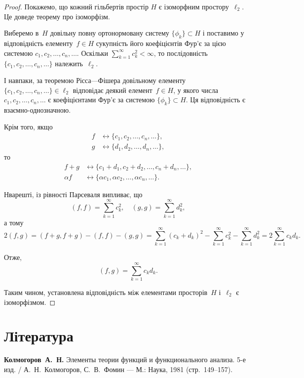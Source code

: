 \begin{proof}
Покажемо, що кожний гільбертів простір
$H$ є ізоморфним простору~$\ell_2$.
Це доведе теорему про ізоморфізм.

Виберемо в~$H$ довільну повну ортонормовану систему
$\{\phi_k\} \subset H$ і поставимо у відповідність елементу~$f \in H$
сукупність його коефіцієнтів Фур’є за цією системою
$c_1, c_2, \dots, c_n, \dots$. Оскільки
$\sum_{k = 1}^\infty c_k^2 < \infty$, то послідовність
$\{c_1, c_2, \dots, c_n, \dots\}$ належить~$\ell_2$.

І навпаки, за теоремою Рісса---Фішера довільному елементу
$\{c_1, c_2, \dots, c_n, \dots\} \in \ell_2$
відповідає деякий елемент~$f \in H$, у якого числа
$c_1, c_2, \dots, c_n, \dots$ є коефіцієнтами Фур’є за системою
$\{\phi_k\} \subset H$. Ця відповідність є взаємно-однозначною.

Крім того, якщо
\begin{align*}
    f &\leftrightarrow \{c_1, c_2, \dots, c_n, \dots\}, \\
    g &\leftrightarrow \{d_1, d_2, \dots, d_n, \dots\},
\end{align*}
то
\begin{align*}
    f + g &\leftrightarrow \{c_ 1 + d_1, c_2 + d_2, \dots, c_n + d_n, \dots\}, \\
    \alpha f &\leftrightarrow \{\alpha c_1, \alpha c_2, \dots, \alpha c_n, \dots\}.
\end{align*}

Нварешті, із рівності Парсеваля випливає, що
\begin{equation*}
    (f, f) = \sum_{k = 1}^\infty c_k^2, \quad
    (g, g) = \sum_{k = 1}^\infty d_k^2,
\end{equation*}
а тому
\begin{equation*}
    2 (f, g) = (f + g, f + g) - (f, f) - (g, g) =
    \sum_{k = 1}^\infty (c_k + d_k)^2 -
    \sum_{k = 1}^\infty c_k^2 -
    \sum_{k = 1}^\infty d_k^2 =
    2 \sum_{k = 1}^\infty c_k d_k.
\end{equation*}

Отже,
\begin{equation*}
    (f, g) = \sum_{k = 1}^\infty c_k d_k.
\end{equation*}

Таким чином, установлена відповідність між елементами
просторів~$H$ і~$\ell_2$ є ізоморфізмом. 
\end{proof}

\section{Література}

\begin{enumerate}[label={[\arabic*]}]
\item \textbf{Колмогоров~А.~Н.}
Элементы теории функций и функционального анализа. 5-е изд. /
А.~Н.~Колмогоров, С.~В.~Фомин ---
М.: Наука, 1981 (стр.~149--157).
\end{enumerate}
